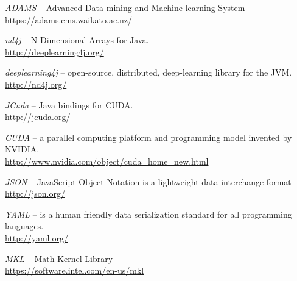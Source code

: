%

\begin{thebibliography}{999}

		\textit{ADAMS} -- Advanced Data mining and Machine learning System \\
		\url{https://adams.cms.waikato.ac.nz/}{}
		
		\textit{nd4j} -- N-Dimensional Arrays for Java. \\
		\url{http://deeplearning4j.org/}{}

		\textit{deeplearning4j} -- open-source, distributed,
		deep-learning library for the JVM. \\
		\url{http://nd4j.org/}{}

		\textit{JCuda} -- Java bindings for CUDA. \\
		\url{http://jcuda.org/}{}

		\textit{CUDA} -- a parallel computing platform and
		programming model invented by NVIDIA. \\
		\url{http://www.nvidia.com/object/cuda_home_new.html}{}

		\textit{JSON} -- JavaScript Object Notation is a lightweight data-interchange format \\
		\url{http://json.org/}{}

		\textit{YAML} -- is a human friendly data serialization
                standard for all programming languages. \\
		\url{http://yaml.org/}{}

		\textit{MKL} -- Math Kernel Library \\
		\url{https://software.intel.com/en-us/mkl}{}

\end{thebibliography}
